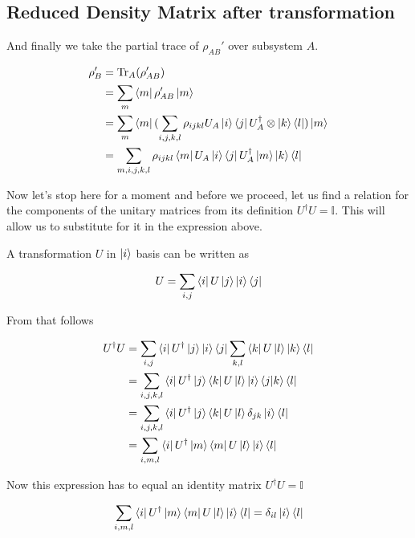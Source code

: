 \documentclass[11pt,a4paper]{article}
\begin{document}
\subsection{Reduced Density Matrix after transformation}

And finally we take the partial trace of $\rho_{AB}'$ over subsystem $A$.

\begin{align}
  \rho_{B}' &= \mathrm{Tr}_{A}(\rho_{AB}') \\
            &= \sum_{m} \bra{m}\rho_{AB}'\ket{m} \\
            &= \sum_{m} \bra{m}(\sum_{i, j, k, l} \rho_{ijkl} U_A\ket{i}\bra{j}U_A^{\dagger} \otimes \ket{k}\bra{l})\ket{m} \\
            &= \sum_{m, i, j, k, l} \rho_{ijkl} \bra{m}U_A\ket{i}\bra{j}U_A^{\dagger}\ket{m} \ket{k}\bra{l}
\label{eq:rho_b_transformed}
\end{align}

Now let's stop here for a moment and before we proceed, let us find a relation for the components
of the unitary matrices from its definition $U^{\dagger}U = \mathbb{I}$. This will allow us to substitute
for it in the expression above.

A transformation $U$ in $\ket{i}$ basis can be written as

\begin{equation}
  U = \sum_{i,j} \bra{i}U\ket{j}\ket{i}\bra{j}
\end{equation}

From that follows

\begin{align}
  U^{\dagger}U &= \sum_{i,j} \bra{i}U^{\dagger}\ket{j}\ket{i}\bra{j} \sum_{k,l} \bra{k}U\ket{l}\ket{k}\bra{l} \\
               &= \sum_{i,j,k,l} \bra{i}U^{\dagger}\ket{j}\bra{k}U\ket{l}\ket{i}\bra{j}\ket{k}\bra{l} \\
               &= \sum_{i,j,k,l} \bra{i}U^{\dagger}\ket{j}\bra{k}U\ket{l} \delta_{jk}\ket{i}\bra{l} \\
               &= \sum_{i,m,l} \bra{i}U^{\dagger}\ket{m}\bra{m}U\ket{l} \ket{i}\bra{l}
\end{align}

Now this expression has to equal an identity matrix $U^{\dagger}U = \mathbb{I}$

\begin{align}
  \sum_{i,m,l} \bra{i}U^{\dagger}\ket{m}\bra{m}U\ket{l} \ket{i}\bra{l} = \delta_{il}\ket{i}\bra{l}
\end{align}
\end{document}

